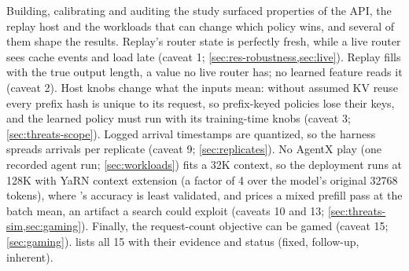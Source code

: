 Building, calibrating and auditing the study surfaced properties of the API, the replay host and the
workloads that can change which policy wins, and several of them shape the results. Replay's router
state is perfectly fresh, while a live router sees cache events and load late (caveat 1;
\cref{sec:res-robustness,sec:live}). Replay fills  with the true output
length, a value no live router has; no learned feature reads it (caveat 2). Host knobs change what
the inputs mean: without assumed KV reuse every prefix hash is unique to its request, so prefix-keyed
policies lose their keys, and the learned policy must run with its training-time knobs (caveat 3;
\cref{sec:threats-scope}). Logged arrival timestamps are quantized, so the harness spreads arrivals
per replicate (caveat 9; \cref{sec:replicates}). No AgentX play (one recorded agent run;
\cref{sec:workloads}) fits a 32K context, so the deployment runs at 128K with YaRN context extension
(a factor of 4 over the model's original \num{32768} tokens), where \ais{}'s accuracy is least
validated, and \aisim{} prices a mixed prefill
pass at the batch mean, an artifact a search could exploit (caveats 10 and 13;
\cref{sec:threats-sim,sec:gaming}). Finally, the request-count objective can be gamed (caveat 15;
\cref{sec:gaming}).  lists all 15 with their evidence and status (fixed, follow-up,
inherent).

